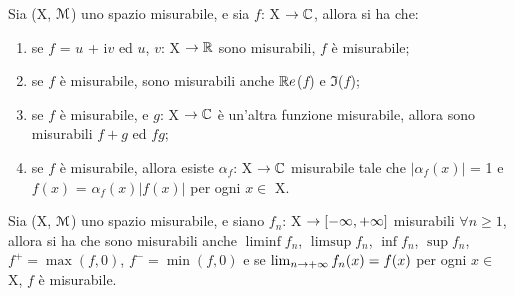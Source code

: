 \documentclass[Completo.tex]{subfiles}
\begin{document}
	\begin{Prop}
		Sia (X, $\eu[M]$) uno spazio misurabile, e sia $f$: X $\ra \bb[C]$, allora si ha che:
		\begin{enumerate}
			\item se $f$ = $u$ + i$v$ ed $u$, $v$: X $\ra \bb[R]$ sono misurabili, $f$ è misurabile;
			\item se $f$ è misurabile, sono misurabili anche $\bb[R]e$($f$) e $\Im$($f$);
			\item se $f$ è misurabile, e $g$: X $\ra \bb[C]$ è un'altra funzione misurabile, allora sono misurabili $f+g$ ed $fg$;
			\item se $f$ è misurabile, allora esiste $\alpha_f$: X $\ra \bb[C]$ misurabile tale che $\vert \alpha_f(x) \vert$ = 1 e $f(x)$ = $\alpha_f(x) \vert f(x) \vert$ per ogni $x \in$ X.
		\end{enumerate}
	\end{Prop}
	\begin{Prop}
		Sia (X, $\eu[M]$) uno spazio misurabile, e siano $f_n$: X $\rightarrow [-\infty, +\infty]$ misurabili $\forall n \geq 1$, allora si ha che sono misurabili anche $\liminf f_n$, $\limsup f_n$, $\inf f_n$, $\sup f_n$, $f^{+} = \max(f, 0)$, $f^{-} = \min(f, 0)$ e se $\lim_{n \rightarrow +\infty} f_n(x) = f(x)$ per ogni $x \in$ X, $f$ è misurabile.
	\end{Prop}
\end{document}
